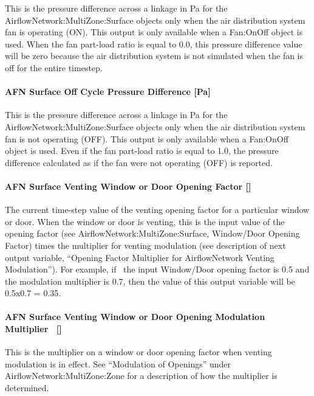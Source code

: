 This is the pressure difference across a linkage in Pa for the AirflowNetwork:MultiZone:Surface objects only when the air distribution system fan is operating (ON). This output is only available when a Fan:OnOff object is used. When the fan part-load ratio is equal to 0.0, this pressure difference value will be zero because the air distribution system is not simulated when the fan is off for the entire timestep.

\paragraph{AFN Surface Off Cycle Pressure Difference {[}Pa{]}}\label{afn-surface-off-cycle-pressure-difference-pa}

This is the pressure difference across a linkage in Pa for the AirflowNetwork:MultiZone:Surface objects only when the air distribution system fan is not operating (OFF). This output is only available when a Fan:OnOff object is used. Even if the fan part-load ratio is equal to 1.0, the pressure difference calculated as if the fan were not operating (OFF) is reported.

\paragraph{AFN Surface Venting Window or Door Opening Factor {[]}}\label{afn-surface-venting-window-or-door-opening-factor}

The current time-step value of the venting opening factor for a particular window or door. When the window or door is venting, this is the input value of the opening factor (see AirflowNetwork:MultiZone:Surface, Window/Door Opening Factor) times the multiplier for venting modulation (see description of next output variable, ``Opening Factor Multiplier for AirflowNetwork Venting Modulation''). For example, if~ the input Window/Door opening factor is 0.5 and the modulation multiplier is 0.7, then the value of this output variable will be 0.5x0.7 = 0.35.

\paragraph{AFN Surface Venting Window or Door Opening Modulation Multiplier~ {[]}}\label{afn-surface-venting-window-or-door-opening-modulation-multiplier}

This is the multiplier on a window or door opening factor when venting modulation is in effect. See ``Modulation of Openings'' under AirflowNetwork:MultiZone:Zone for a description of how the multiplier is determined.

